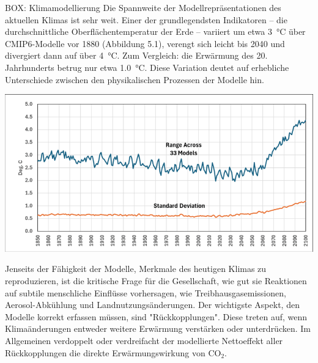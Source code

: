 \documentclass[12pt,paper=a4,DIV=12,parskip=never,chapterprefix=false,headings=standardclasses]{scrreprt}
\begin{document}
\begin{fullbox}{BOX: Klimamodellierung}
Die Spannweite der Modellrepräsentationen des aktuellen Klimas ist sehr weit. Einer der grundlegendsten Indikatoren – die durchschnittliche Oberflächentemperatur der Erde – variiert um etwa \SI{3}{\celsius} über CMIP6-Modelle vor 1880 (Abbildung 5.1), verengt sich leicht bis 2040 und divergiert dann auf über \SI{4}{\celsius}. Zum Vergleich: die Erwärmung des 20. Jahrhunderts betrug nur etwa \SI{1.0}{\celsius}. Diese Variation deutet auf erhebliche Unterschiede zwischen den physikalischen Prozessen der Modelle hin.

\tcblower
\begin{minipage}{\linewidth}
  \centering
  \includegraphics[width=.9\textwidth]{bilder/bilderKlima-0024.png}
\end{minipage}

Jenseits der Fähigkeit der Modelle, Merkmale des heutigen Klimas zu reproduzieren, ist die kritische Frage für die Gesellschaft, wie gut sie Reaktionen auf subtile menschliche Einflüsse vorhersagen, wie Treibhausgasemissionen, Aerosol-Abkühlung und Landnutzungsänderungen. Der wichtigste Aspekt, den Modelle korrekt erfassen müssen, sind "Rückkopplungen". Diese treten auf, wenn Klimaänderungen entweder weitere Erwärmung verstärken oder unterdrücken. Im Allgemeinen verdoppelt oder verdreifacht der modellierte Nettoeffekt aller Rückkopplungen die direkte Erwärmungswirkung von CO$_2$.
\end{fullbox}
\end{document}
